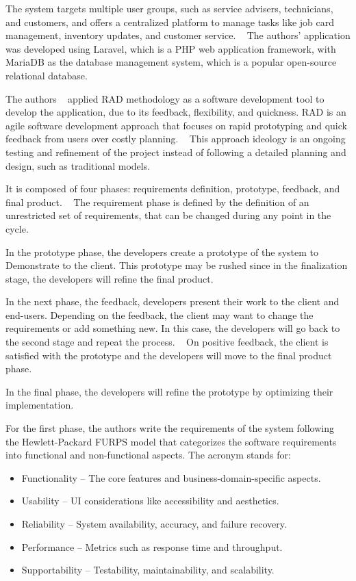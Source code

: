 The system targets multiple user groups, such as service advisers, technicians, and customers, and offers a centralized platform to manage tasks like job card management, inventory updates, and customer service. ~\cite{MAS_MOTORS}
The authors' application was developed using Laravel, which is a PHP web application framework, with MariaDB as the database management system, which is a popular open-source relational database.

The authors ~\citet{MAS_MOTORS} applied \ac{RAD} methodology as a software development tool to develop the application, due to its feedback, flexibility, and quickness.
\ac{RAD} is an agile software development approach that focuses on rapid prototyping and quick feedback from users over costly planning. ~\cite{rapid_app_development}
This approach ideology is an ongoing testing and refinement of the project instead of following a detailed planning and design, such as traditional models.

It is composed of four phases: requirements definition, prototype, feedback, and final product. ~\cite{rapid_app_development}
The requirement phase is defined by the definition of an unrestricted set of requirements, that can be changed during any point in the cycle. 

In the prototype phase, the developers create a prototype of the system to Demonstrate to the client. 
This prototype may be rushed since in the finalization stage, the developers will refine the final product. ~\cite{rapid_app_development}

In the next phase, the feedback, developers present their work to the client and end-users.
Depending on the feedback, the client may want to change the requirements or add something new. In this case, the developers will go back to the second stage and repeat the process. ~\cite{rapid_app_development}
On positive feedback, the client is satisfied with the prototype and the developers will move to the final product phase.

In the final phase, the developers will refine the prototype by optimizing their implementation. ~\cite{rapid_app_development}

For the first phase, the authors write the requirements of the system following the Hewlett-Packard \ac{FURPS} model that categorizes the software requirements into functional and non-functional aspects.
The acronym stands for:

\begin{itemize}
   \item Functionality – The core features and business-domain-specific aspects.
   \item Usability – \ac{UI} considerations like accessibility and aesthetics.
   \item Reliability – System availability, accuracy, and failure recovery.
   \item Performance – Metrics such as response time and throughput.
   \item Supportability – Testability, maintainability, and scalability.
  \end{itemize}

